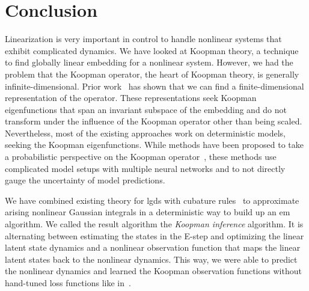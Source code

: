 \chapter{Conclusion}
\label{c:conclusion}



Linearization is very important in control to handle nonlinear systems that exhibit complicated dynamics. We have looked at Koopman theory, a technique to find globally linear embedding for a nonlinear system. However, we had the problem that the Koopman operator, the heart of Koopman theory, is generally infinite-dimensional. Prior work~\cite{bruntonKoopmanInvariantSubspaces2016,kaiserDatadrivenDiscoveryKoopman2020,luschDeepLearningUniversal2018} has shown that we can find a finite-dimensional representation of the operator. These representations seek Koopman eigenfunctions that span an invariant subspace of the embedding and do not transform under the influence of the Koopman operator other than being scaled. Nevertheless, most of the existing approaches work on deterministic models, seeking the Koopman eigenfunctions. While methods have been proposed to take a probabilistic perspective on the Koopman operator~\cite{mortonDeepVariationalKoopman2019a}, these methods use complicated model setups with multiple neural networks and to not directly gauge the uncertainty of model predictions.

We have combined existing theory for \acl{lgds} with cubature rules~\cite{solinCubatureIntegrationMethods2010} to approximate arising nonlinear Gaussian integrals in a deterministic way to build up an \acl{em} algorithm. We called the result algorithm the \emph{Koopman inference} algorithm. It is alternating between estimating the states in the E-step and optimizing the linear latent state dynamics and a nonlinear observation function that maps the linear latent states back to the nonlinear dynamics. This way, we were able to predict the nonlinear dynamics and learned the Koopman observation functions without hand-tuned loss functions like in~\cite{luschDeepLearningUniversal2018}.

